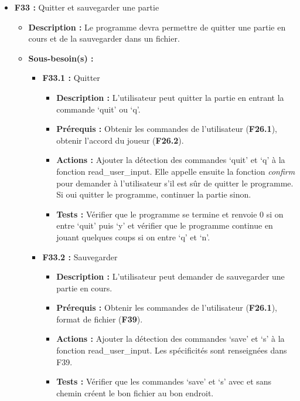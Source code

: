\documentclass{article}
\begin{document}
\begin{itemize}
\begin{itemize}
    \end{itemize}
\bigskip
    \item \textbf{F33 :} Quitter et sauvegarder une partie
    \begin{itemize}
        \item \textbf{Description :} Le programme devra permettre de quitter une partie en cours et de la sauvegarder dans un fichier. 
        \item \textbf{Sous-besoin(s) :}
        \begin{itemize}
            \smallskip
            \item \textbf{F33.1 :} Quitter
            \begin{itemize}
                \item \textbf{Description :} L’utilisateur peut quitter la partie en entrant la commande ‘quit’ ou ‘q’.
                \item \textbf{Prérequis :} Obtenir les commandes de l’utilisateur (\textbf{F26.1}), obtenir l’accord du joueur (\textbf{F26.2}).
                \item \textbf{Actions :} Ajouter la détection des commandes ‘quit’ et ‘q’ à la fonction read\_user\_input. Elle appelle ensuite la fonction\textit{ confirm} pour demander à l’utilisateur s'il est sûr de quitter le programme. Si oui quitter le programme, continuer la partie sinon.
                \item \textbf{Tests :} Vérifier que le programme se termine et renvoie 0 si on entre ‘quit’ puis ‘y’ et vérifier que le programme continue en jouant quelques coups si on entre ‘q’ et ‘n’.
            \end{itemize}
            \smallskip
            \item \textbf{F33.2 :} Sauvegarder
            \begin{itemize}
                \item \textbf{Description :} L’utilisateur peut demander de sauvegarder une partie en cours.
                \item \textbf{Prérequis :} Obtenir les commandes de l’utilisateur (\textbf{F26.1}), format de fichier (\textbf{F39}).
                \item \textbf{Actions :} Ajouter la détection des commandes ‘save’ et ‘s’ à la fonction read\_user\_input. Les spécificités sont renseignées dans F39.
                \item \textbf{Tests :} Vérifier que les commandes ‘save’ et ‘s’ avec et sans chemin créent le bon fichier au bon endroit.
            \end{itemize}

\end{itemize}
\end{itemize}
\end{itemize}
\end{document}
